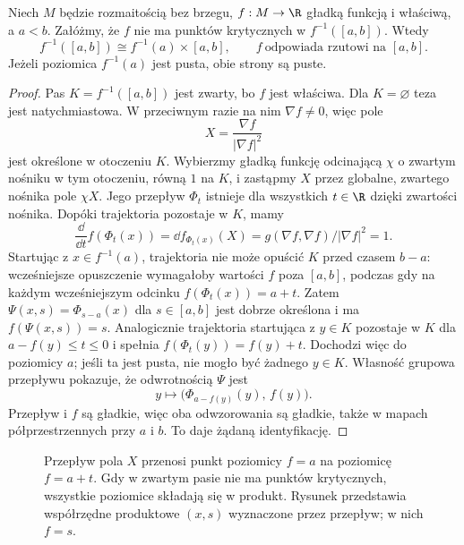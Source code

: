 \begin{twierdzenie}
\label{thm:pas-bez-krytycznych-15}
Niech $M$ będzie rozmaitością bez brzegu,
$f:M\to\R$ gładką funkcją
i właściwą, a $a<b$. Załóżmy,
że $f$ nie ma punktów krytycznych
w $f^{-1}([a,b])$. Wtedy
\[
 f^{-1}([a,b])\cong f^{-1}(a)\times[a,b],
 \qquad f\ \text{odpowiada rzutowi na }[a,b].
\]
Jeżeli poziomica $f^{-1}(a)$ jest pusta,
obie strony są puste.
\end{twierdzenie}
\begin{proof}
Pas $K=f^{-1}([a,b])$ jest zwarty,
bo $f$ jest właściwa. Dla $K=\varnothing$ teza
jest natychmiastowa. W przeciwnym razie na nim
$\nabla f\ne0$, więc pole
\[
 X=\frac{\nabla f}{|\nabla f|^2}
\]
jest określone w otoczeniu $K$.
Wybierzmy gładką funkcję
odcinającą $\chi$ o zwartym
nośniku w tym otoczeniu,
równą $1$ na $K$, i zastąpmy
$X$ przez globalne, zwartego
nośnika pole $\chi X$.
Jego przepływ $\Phi_t$
istnieje dla wszystkich
$t\in\R$ dzięki zwartości
nośnika. Dopóki trajektoria
pozostaje w $K$, mamy
\[
 \frac{\dd}{\dd t}f(\Phi_t(x))
 =\dd f_{\Phi_t(x)}(X)
 =g(\nabla f,\nabla f)/|\nabla f|^2=1.
\]
Startując z $x\in f^{-1}(a)$,
trajektoria nie może opuścić
$K$ przed czasem $b-a$:
wcześniejsze opuszczenie
wymagałoby wartości $f$
poza $[a,b]$, podczas gdy
na każdym wcześniejszym
odcinku $f(\Phi_t(x))=a+t$.
Zatem
$\Psi(x,s)=\Phi_{s-a}(x)$
dla $s\in[a,b]$ jest
dobrze określona i ma
$f(\Psi(x,s))=s$.
Analogicznie trajektoria startująca z $y\in K$
pozostaje w $K$ dla $a-f(y)\leq t\leq0$ i spełnia
$f(\Phi_t(y))=f(y)+t$. Dochodzi więc do poziomicy $a$;
jeśli ta jest pusta, nie mogło być żadnego $y\in K$.
Własność grupowa przepływu pokazuje, że odwrotnością
$\Psi$ jest
\[
 y\longmapsto
       \bigl(\Phi_{a-f(y)}(y),\,f(y)\bigr).
\]
Przepływ i $f$ są gładkie,
więc oba odwzorowania są gładkie,
także w mapach półprzestrzennych
przy $a$ i $b$. To daje
żądaną identyfikację.
\end{proof}

\begin{figure}[H]
\centering
{}
\caption{Przepływ pola $X$ przenosi punkt poziomicy
$f=a$ na poziomicę $f=a+t$. Gdy w zwartym pasie
nie ma punktów krytycznych, wszystkie poziomice
składają się w produkt. Rysunek przedstawia współrzędne
produktowe $(x,s)$ wyznaczone przez przepływ; w nich $f=s$.}
\label{fig:pas-bez-krytycznych-15}
\end{figure}

